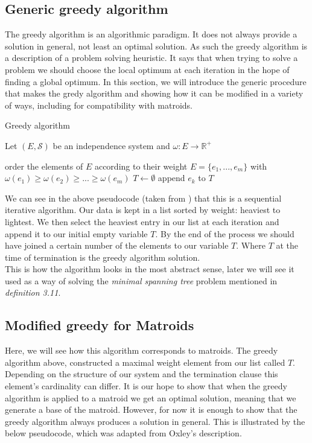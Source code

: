 \documentclass[../main.tex]{subfiles}
\begin{document}
\subsection{Generic greedy algorithm}
The greedy algorithm is an algorithmic paradigm. It does not always provide a solution in general, not least an optimal solution. As such the greedy algorithm is a description of a problem solving heuristic.  It says that when trying to solve a problem we should choose the local optimum at each iteration in the hope of finding a global optimum. In this section, we will introduce the generic procedure that makes the gredy algorithm and showing how it can be modified in a variety of ways, including for compatibility with matroids.

\begin{algorithm}[H]
\caption{Greedy algorithm}\label{greedy}
Let $(E,\mathcal{S})$ be an independence system and $\omega:E \longrightarrow \mathbb{R^+}$
\begin{algorithmic}[1]
\State order the elements of $E$ according to their weight
\State $E = \{ e_1,...,e_m\}$ with $\omega(e_1) \geq \omega(e_2) \geq ... \geq \omega(e_m)$
\State $T\gets \emptyset$
	 	\State append $e_k$ to $T$
	\EndIf
\EndFor
\EndProcedure
\end{algorithmic}
\end{algorithm}

We can see in the above pseudocode (taken from \cite{jungnickel}) that this is a sequential iterative algorithm. Our data is kept in a list sorted by weight: heaviest to lightest. We then select the heaviest entry in our list at each iteration and append it to our initial empty variable $T.$ By the end of the process we should have joined a certain number of the elements to our variable $T.$ Where $T$ at the time of termination is the greedy algorithm solution.\\ This is how the algorithm looks in the most abstract sense, later we will see it used as a way of solving the \textit{minimal spanning tree} problem mentioned in \textit{definition 3.11}.
\subsection{Modified greedy for Matroids}
Here, we will see how this algorithm corresponds to matroids. The greedy algorithm above, constructed a maximal weight element from our list called $T.$ Depending on the structure of our system and the termination clause this element's cardinality can differ. It is our hope to show that when the greedy algorithm is applied to a matroid we get an optimal solution, meaning that we generate a base of the matroid. However, for now it is enough to show that the greedy algorithm always produces a solution in general. This is illustrated by the below pseudocode, which was adapted from Oxley's\cite{ox_book} description.
\end{document}
